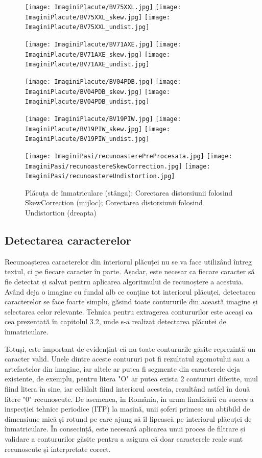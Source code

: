 \documentclass[12pt]{article}
\begin{document}
\begin{figure}[H]
  \centering
  \texttt{[image: ImaginiPlacute/BV75XXL.jpg]}\hfill
    \texttt{[image: ImaginiPlacute/BV75XXL\_skew.jpg]}\hfill
    \texttt{[image: ImaginiPlacute/BV75XXL\_undist.jpg]}
    
     \texttt{[image: ImaginiPlacute/BV71AXE.jpg]}\hfill
    \texttt{[image: ImaginiPlacute/BV71AXE\_skew.jpg]}\hfill
    \texttt{[image: ImaginiPlacute/BV71AXE\_undist.jpg]}
    
     \texttt{[image: ImaginiPlacute/BV04PDB.jpg]}\hfill
    \texttt{[image: ImaginiPlacute/BV04PDB\_skew.jpg]}\hfill
    \texttt{[image: ImaginiPlacute/BV04PDB\_undist.jpg]}

     \texttt{[image: ImaginiPlacute/BV19PIW.jpg]}\hfill
    \texttt{[image: ImaginiPlacute/BV19PIW\_skew.jpg]}\hfill
    \texttt{[image: ImaginiPlacute/BV19PIW\_undist.jpg]}

      \texttt{[image: ImaginiPasi/recunoasterePreProcesata.jpg]}\hfill
    \texttt{[image: ImaginiPasi/recunoastereSkewCorrection.jpg]}\hfill
    \texttt{[image: ImaginiPasi/recunoastereUndistortion.jpg]}
  \caption{Pl\u{a}cuța de \^{i}nmatriculare (st\^{a}nga); Corectarea distorsiunii folosind SkewCorrection (mijloc); Corectarea distorsiunii folosind Undistortion (dreapta)}
  \label{fig:recunoastere_rezultate}
\end{figure}

\subsection{Detectarea caracterelor}

Recunoașterea caracterelor din interiorul pl\u{a}cuței nu se va face utiliz\^{a}nd \^{i}ntreg textul, ci pe fiecare caracter \^{i}n parte. Așadar, este necesar ca fiecare caracter s\u{a} fie detectat și salvat pentru aplicarea algoritmului de recunoștere a acestuia. Av\^{a}nd deja o imagine cu fundal alb ce conține tot interiorul pl\u{a}cuței, detectarea caracterelor se face foarte simplu, g\u{a}sind toate contururile din aceast\u{a} imagine și selectarea celor relevante. Tehnica pentru extragerea contururilor este aceași ca cea prezentat\u{a} \^{i}n capitolul 3.2, unde s-a realizat detectarea pl\u{a}cuței de \^{i}nmatriculare.

Totuși, este important de evidențiat c\u{a} nu toate contururile g\u{a}site reprezint\u{a} un caracter valid. Unele dintre aceste contururi pot fi rezultatul zgomotului sau a artefactelor din imagine, iar altele ar putea fi segmente din caracterele deja existente, de exemplu, pentru litera "O" ar putea exista 2 contururi diferite, unul fiind litera \^{i}n sine, iar cel\u{a}lalt fiind interiorul acesteia, rezult\^{a}nd astfel \^{i}n dou\u{a} litere "0" recunoscute. De asemenea, \^{i}n Rom\^{a}nia, \^{i}n urma finaliz\u{a}rii cu succes a inspecției tehnice periodice (ITP) la mașin\u{a}, unii șoferi primesc un abțibild de dimensiune mic\u{a} și rotund pe care ajung s\u{a} \^{i}l lipeasc\u{a} pe interiorul pl\u{a}cuței de \^{i}nmatriculare. \^{I}n consecinț\u{a}, este necesar\u{a} aplicarea unui proces de filtrare și validare a contururilor g\u{a}site pentru a asigura c\u{a} doar caracterele reale sunt recunoscute și interpretate corect.
\end{document}
